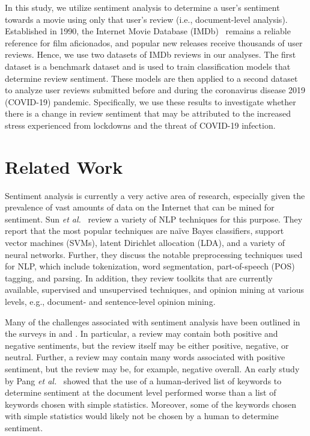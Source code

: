 \documentclass[conference]{IEEEtran}
\begin{document}
In this study, we utilize sentiment analysis to determine a user's sentiment towards a movie using only that user's review (i.e., document-level analysis). Established in 1990, the Internet Movie Database (IMDb)~\cite{ref:IMDb} remains a reliable reference for film aficionados, and popular new releases receive thousands of user reviews. Hence, we use two datasets of IMDb reviews in our analyses. The first dataset is a benchmark dataset and is used to train classification models that determine review sentiment. These models are then applied to a second dataset to analyze user reviews submitted before and during the coronavirus disease 2019 (COVID-19) pandemic. Specifically, we use these results to investigate whether there is a change in review sentiment that may be attributed to the increased stress experienced from lockdowns and the threat of COVID-19 infection.

\section{Related Work}\label{sec:RelatedWork}
Sentiment analysis is currently a very active area of research, especially given the prevalence of vast amounts of data on the Internet that can be mined for sentiment. Sun \emph{et al.}~\cite{ref:Sun} review a variety of NLP techniques for this purpose. They report that the most popular techniques are na\"{i}ve Bayes classifiers, support vector machines (SVMs), latent Dirichlet allocation (LDA), and a variety of neural networks. Further, they discuss the notable preprocessing techniques used for NLP, which include tokenization, word segmentation, part-of-speech (POS) tagging, and parsing. In addition, they review toolkits that are currently available, supervised and unsupervised techniques, and opinion mining at various levels, e.g., document- and sentence-level opinion mining.

Many of the challenges associated with sentiment analysis have been outlined in the surveys in \cite{ref:PangJour} and \cite{ref:BLiu}. In particular, a review may contain both positive and negative sentiments, but the review itself may be either positive, negative, or neutral. Further, a review may contain many words associated with positive sentiment, but the review may be, for example, negative overall. An early study by Pang \emph{et al.}~\cite{ref:PangConf} showed that the use of a human-derived list of keywords to determine sentiment at the document level performed worse than a list of keywords chosen with simple statistics. Moreover, some of the keywords chosen with simple statistics would likely not be chosen by a human to determine sentiment.
\end{document}
